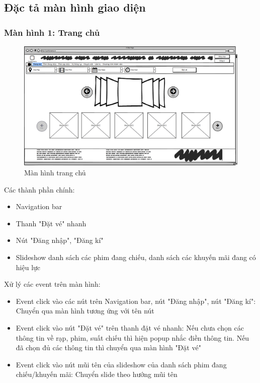 \documentclass[a4paper, 12pt]{article}
\begin{document}
	\subsection{Đặc tả màn hình giao diện}
		\subsubsection{Màn hình 1: Trang chủ}
			\begin{figure}[H]
				\begin{center}
					\includegraphics[scale = 0.25]{Wireframe/User/Homepage.png}
					\caption{Màn hình trang chủ}
				\end{center}
			\end{figure}
			Các thành phần chính: 
			\begin{itemize}
				\item Navigation bar
				\item Thanh "Đặt vé" nhanh
				\item Nút "Đăng nhập", "Đăng kí"
				\item Slideshow danh sách các phim đang chiếu, danh sách các khuyến mãi đang có hiệu lực
			\end{itemize}
			Xử lý các event trên màn hình:
			\begin{itemize}
				\item Event click vào các nút trên Navigation bar, nút "Đăng nhập", nút "Đăng kí": Chuyển qua màn hình tương ứng với tên nút
				\item Event click vào nút "Đặt vé" trên thanh đặt vé nhanh: Nếu chưa chọn các thông tin về rạp, phim, suất chiếu thì hiện popup nhắc điền thông tin. Nếu đã chọn đủ các thông tin thì chuyển qua màn hình "Đặt vé"
				\item Event click vào nút mũi tên của slideshow của danh sách phim đang chiếu/khuyến mãi: Chuyển slide theo hướng mũi tên
			\end{itemize}
\end{document}

